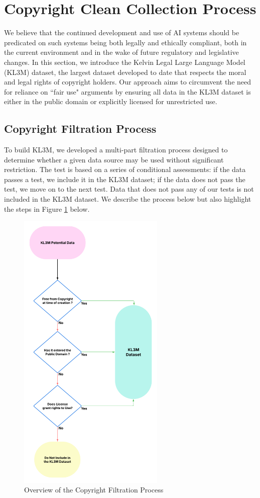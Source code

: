\section{Copyright Clean Collection Process}
We believe that the continued development and use of AI systems should be predicated on such systems being both legally and ethically compliant, both in the current environment and in the wake of future regulatory and legislative changes.  In this section, we introduce the Kelvin Legal Large Language Model (KL3M) dataset, the largest dataset developed to date that respects the moral and legal rights of copyright holders. Our approach aims to circumvent the need for reliance on ``fair use" arguments by ensuring all data in the KL3M dataset is either in the public domain or explicitly licensed for unrestricted use.


\subsection{Copyright Filtration Process}
To build KL3M, we developed a multi-part filtration process designed to determine whether a given data source may be used without significant restriction. The test is based on a series of conditional assessments: if the data passes a test, we include it in the KL3M dataset; if the data does not pass the test, we move on to the next test. Data that does not pass any of our tests is not included in the KL3M dataset.  We describe the process below but also highlight the steps in Figure \ref{fig:CopyrightFlowchart} below.

\begin{figure}[ht!]
\centering
\includegraphics[width=70mm]{CopyrightFlowchart.pdf}
\caption{Overview of the Copyright Filtration Process}
\label{fig:CopyrightFlowchart}
\end{figure}

